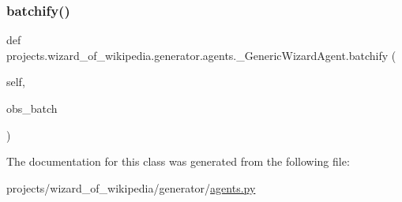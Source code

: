 \subsubsection{\texorpdfstring{batchify()}{batchify()}}
{\footnotesize\ttfamily def projects.\+wizard\+\_\+of\+\_\+wikipedia.\+generator.\+agents.\+\_\+\+Generic\+Wizard\+Agent.\+batchify (\begin{DoxyParamCaption}\item[{}]{self,  }\item[{}]{obs\+\_\+batch }\end{DoxyParamCaption})}



The documentation for this class was generated from the following file\+:\begin{DoxyCompactItemize}
\item 
projects/wizard\+\_\+of\+\_\+wikipedia/generator/\hyperlink{projects_2wizard__of__wikipedia_2generator_2agents_8py}{agents.\+py}\end{DoxyCompactItemize}
